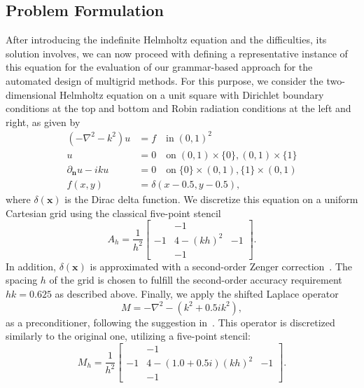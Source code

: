 \subsection{Problem Formulation}
After introducing the indefinite Helmholtz equation and the difficulties, its solution involves, we can now proceed with defining a representative instance of this equation for the evaluation of our grammar-based approach for the automated design of multigrid methods.
For this purpose, we consider the two-dimensional Helmholtz equation on a unit square with Dirichlet boundary conditions at the top and bottom and Robin radiation conditions at the left and right, as given by
\begin{equation}
	\label{eq:helmholtz-test-problem}
	\begin{split}
		(-\nabla ^{2} - k^{2}) u & = f \quad \text{in} \; \left( 0, 1 \right)^2 \\
		u & = 0 \quad \text{on} \; \left( 0, 1 \right) \times \{0\}, \left( 0, 1 \right) \times \{1\} \\
		\partial_{\mathbf{n}} u - iku & = 0 \quad \text{on} \; \{0\} \times \left( 0, 1 \right), \{1\} \times \left( 0, 1 \right) \\
		f(x, y) & = \delta(x - 0.5, y - 0.5),
	\end{split}
\end{equation}
where $\delta(\bm{x})$ is the Dirac delta function.
We discretize this equation on a uniform Cartesian grid using the classical five-point stencil
\begin{equation*}
	A_h = \frac{1}{h^2} \begin{bmatrix}
		& -1 & \\
		-1 & 4 - (k h)^2 & -1 \\
		& -1 &  
	\end{bmatrix}.
\end{equation*}
In addition, $\delta(\bm{x})$ is approximated with a second-order Zenger correction~\cite{koestler2004extrapolation}.
The spacing $h$ of the grid is chosen to fulfill the second-order accuracy requirement $h k = 0.625$ as described above.
Finally, we apply the shifted Laplace operator
\begin{equation*}
	M = -\nabla^{2} - (k^{2} + 0.5 i k^{2}),
\end{equation*}
as a preconditioner, following the suggestion in~\cite{erlangga2008advances}.
This operator is discretized similarly to the original one, utilizing a five-point stencil:
\begin{equation*}
	M_h = \frac{1}{h^2} \begin{bmatrix}
		& -1 & \\
		-1 & 4 - (1.0 + 0.5i)(k h)^2 & -1 \\
		& -1 &  
	\end{bmatrix}.
\end{equation*}

